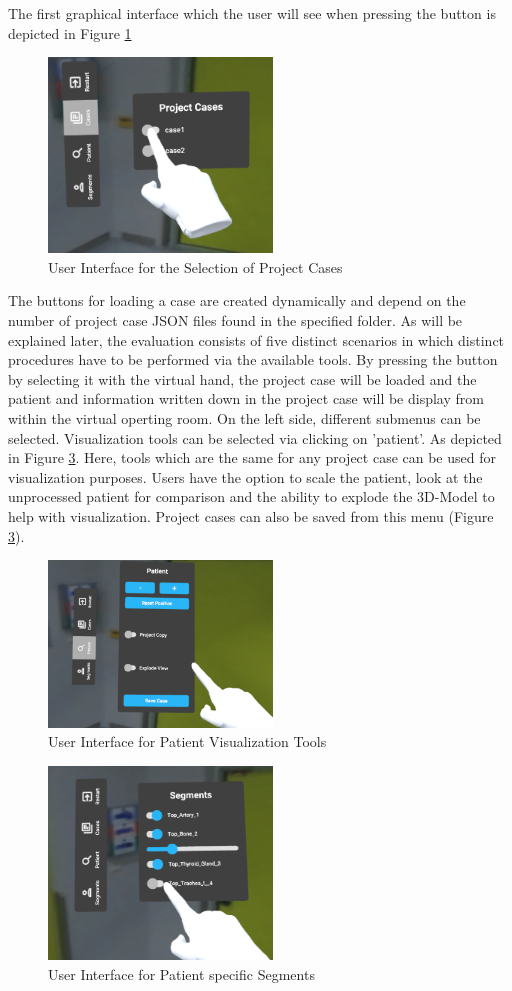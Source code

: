 The first graphical interface which the user will see when pressing the button is depicted in Figure \ref{fig::UIProjectCase}
\begin{figure}[ht!]
    \centering
    \includegraphics[width=225px]{images/implementation/user_interface/project_cases.png}
    \caption{\label{fig::UIProjectCase}User Interface for the Selection of Project Cases}
\end{figure}
The buttons for loading a case are created dynamically and depend on the number of project case JSON files found in the specified folder.
As will be explained later, the evaluation consists of five distinct scenarios in which distinct procedures have to be performed via the available tools.
By pressing the button by selecting it with the virtual hand, the project case will be loaded and the patient and information written down in the project case will be display from within the virtual operting room.
On the left side, different submenus can be selected.
Visualization tools can be selected via clicking on 'patient'.
As depicted in Figure \ref{fig::UIPatient}.
Here, tools which are the same for any project case can be used for visualization purposes.
Users have the option to scale the patient, look at the unprocessed patient for comparison and the ability to explode the 3D-Model to help with visualization.
Project cases can also be saved from this menu (Figure \ref{fig::UIPatient}).

\begin{figure}[ht!]
    \centering
    \includegraphics[width=225px]{images/implementation/user_interface/patient.png}
    \caption{\label{fig::UIPatient}User Interface for Patient Visualization Tools}
\end{figure}

\begin{figure}[ht!]
    \centering
    \includegraphics[width=225px]{images/implementation/user_interface/segments.png}
    \caption{\label{fig::UIPatient}User Interface for Patient specific Segments}
\end{figure}
